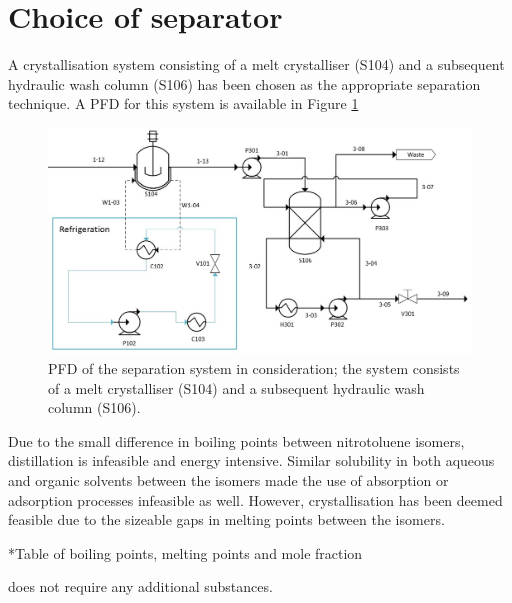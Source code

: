 \section{Choice of separator}
A crystallisation system consisting of a melt crystalliser (S104) and a subsequent hydraulic wash column (S106) has been chosen as the appropriate separation technique. A PFD for this system is available in Figure \ref{fig:separator PFD}


\begin{figure}[h]
    \centering
    \includegraphics[scale=0.6]{chapters/3-separation/figures/Crystallizer PFD.jpg}
    \caption{PFD of the separation system in consideration; the system consists of a melt crystalliser (S104) and a subsequent hydraulic wash column (S106).}
    \label{fig:separator PFD}
\end{figure}

Due to the small difference in boiling points between nitrotoluene isomers, distillation is infeasible and energy intensive. Similar solubility in both aqueous and organic solvents between the isomers made the use of absorption or adsorption processes infeasible as well. However, crystallisation has been deemed feasible due to the sizeable gaps in melting points between the isomers.

*Table of boiling points, melting points and mole fraction

does not require any additional substances. 

